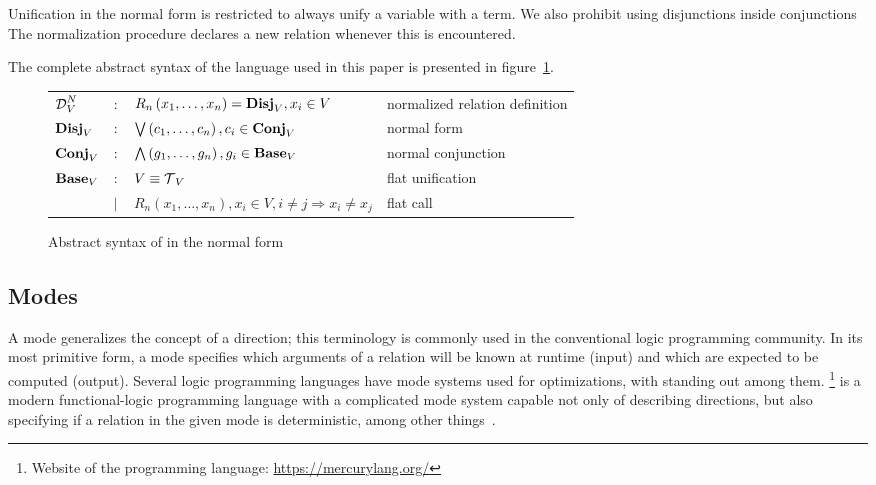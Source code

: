 Unification in the normal form is restricted to always unify a variable with a term.
We also prohibit using disjunctions inside conjunctions
The normalization procedure declares a new relation whenever this is encountered.

The complete abstract syntax of the \micro language used in this paper is presented in figure~\ref{fig:miniKanren}.

\begin{figure}[h]
    \begin{tabular}{llll}
     $\operatorname{\mathcal{D}}_{V}^N$ & $:$ & $R_{n}\left( x_1, \ldots, x_{n} \right) = \operatorname{\mathbf{Disj}}_{V}, x_{i}\in V$ & normalized relation definition \\
    $\operatorname{\mathbf{Disj}}_{V}$ & $:$ & $\bigvee\left( c_1, \ldots, c_{n} \right), c_{i}\in \operatorname{\mathbf{Conj}}_{V}$ & normal form \\
    $\operatorname{\mathbf{Conj}}_{V}$ & $:$ & $\bigwedge\left( g_1, \ldots, g_n \right), g_{i}\in \operatorname{\mathbf{Base}}_{V}$ & normal conjunction \\
    $\operatorname{\mathbf{Base}}_{V}$ & $:$ & $V \equiv \operatorname{\mathcal{T}}_{V}$ & flat unification \\
                & $\mid$ & $R_{n}\left( x_1, \ldots, x_{n} \right), x_{i}\in V, i \neq j \Rightarrow x_i \neq x_j$ & flat call\\

    \end{tabular}
    \caption{Abstract syntax of \micro in the normal form}
    \label{fig:miniKanren}
\end{figure}

\subsection{Modes}

A mode generalizes the concept of a direction; this terminology is commonly used in the conventional logic programming community.
In its most primitive form, a mode specifies which arguments of a relation will be known at runtime (input) and which are expected to be computed (output).
Several logic programming languages have mode systems used for optimizations, with \merc standing out among them.
\merc\footnote{Website of the \merc programming language: \url{https://mercurylang.org/}} is a modern functional-logic programming language with a complicated mode system capable not only of describing directions, but also specifying if a relation in the given mode is deterministic, among other things~\cite{overton2002constraint}.

